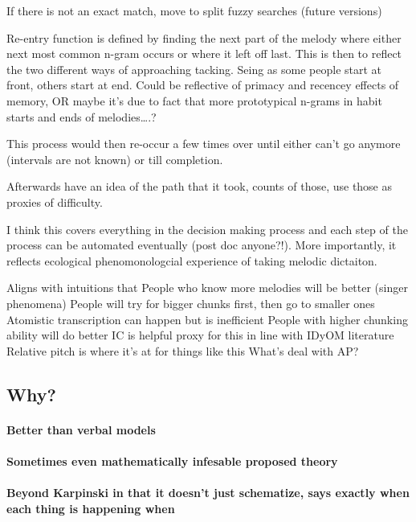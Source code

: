 \documentclass[]{book}
\let\oldparagraph\paragraph
\renewcommand{\paragraph}[1]{\oldparagraph{#1}\mbox{}}
\theoremstyle{definition}
\theoremstyle{definition}
\theoremstyle{definition}
\theoremstyle{remark}
\begin{document}
If there is not an exact match, move to split fuzzy searches (future
versions)

Re-entry function is defined by finding the next part of the melody
where either next most common n-gram occurs or where it left off last.
This is then to reflect the two different ways of approaching tacking.
Seing as some people start at front, others start at end. Could be
reflective of primacy and recencey effects of memory, OR maybe it's due
to fact that more prototypical n-grams in habit starts and ends of
melodies\ldots{}.?

This process would then re-occur a few times over until either can't go
anymore (intervals are not known) or till completion.

Afterwards have an idea of the path that it took, counts of those, use
those as proxies of difficulty.

I think this covers everything in the decision making process and each
step of the process can be automated eventually (post doc anyone?!).
More importantly, it reflects ecological phenomonologcial experience of
taking melodic dictaiton.

Aligns with intuitions that People who know more melodies will be better
(singer phenomena) People will try for bigger chunks first, then go to
smaller ones Atomistic transcription can happen but is inefficient
People with higher chunking ability will do better IC is helpful proxy
for this in line with IDyOM literature Relative pitch is where it's at
for things like this What's deal with AP?

\hypertarget{why-2}{%
\subsection{Why?}\label{why-2}}

\hypertarget{better-than-verbal-models}{%
\paragraph{Better than verbal models}\label{better-than-verbal-models}}

\hypertarget{sometimes-even-mathematically-infesable-proposed-theory}{%
\paragraph{Sometimes even mathematically infesable proposed
theory}\label{sometimes-even-mathematically-infesable-proposed-theory}}

\hypertarget{beyond-karpinski-in-that-it-doesnt-just-schematize-says-exactly-when-each-thing-is-happening-when}{%
\paragraph{Beyond Karpinski in that it doesn't just schematize, says
exactly when each thing is happening
when}\label{beyond-karpinski-in-that-it-doesnt-just-schematize-says-exactly-when-each-thing-is-happening-when}}
\end{document}
